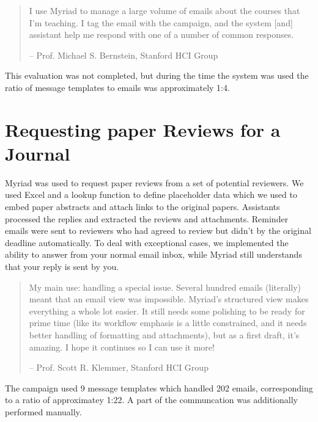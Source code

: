 \begin{quote}

I use Myriad to manage a large volume of emails about the courses that I'm teaching. I tag the email with the campaign, and the system [and] assistant help me respond with one of a number of common responses.

\begin{flushright}
   -- Prof. Michael S. Bernstein, Stanford HCI Group
\end{flushright}

\end{quote}

This evaluation was not completed, but during the time the system was used the ratio of message templates to emails was approximately 1:4.


\section{Requesting paper Reviews for a Journal}

Myriad was used to request paper reviews from a set of potential reviewers. We used Excel and a lookup function to define placeholder data which we used to embed paper abstracts and attach links to the original papers. Assistants processed the replies and extracted the reviews and attachments. Reminder emails were sent to reviewers who had agreed to review but didn’t by the original deadline automatically.
To deal with exceptional cases, we implemented the ability to answer from your normal email inbox, while Myriad still understands that your reply is sent by you.

\begin{quote}

My main use: handling a special issue. Several hundred emails (literally) meant that an email view was impossible. Myriad’s structured view makes everything a whole lot easier. It still needs some polishing to be ready for prime time (like its workflow emphasis is a little constrained, and it needs better handling of formatting and attachments), but as a first draft, it's amazing. I hope it continues so I can use it more!

\begin{flushright}
   -- Prof. Scott R. Klemmer, Stanford HCI Group
\end{flushright}

\end{quote}

The campaign used 9 message templates which handled 202 emails, corresponding to a ratio of approximatey 1:22. A part of the communcation was additionally performed manually.

